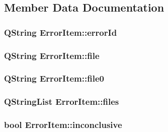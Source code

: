 \subsection{Member Data Documentation}
\hypertarget{class_error_item_aff1725eaf4ca3d7ce627a451b38b712a}{
\subsubsection[{error\-Id}]{\setlength{\rightskip}{0pt plus 5cm}Q\-String Error\-Item\-::error\-Id}}\label{class_error_item_aff1725eaf4ca3d7ce627a451b38b712a}
\hypertarget{class_error_item_a7ef5bfcb23db4b9ee239cb23a51dbe3c}{
\subsubsection[{file}]{\setlength{\rightskip}{0pt plus 5cm}Q\-String Error\-Item\-::file}}\label{class_error_item_a7ef5bfcb23db4b9ee239cb23a51dbe3c}
\hypertarget{class_error_item_a37601c0b1e90e2837ef6600180640868}{
\subsubsection[{file0}]{\setlength{\rightskip}{0pt plus 5cm}Q\-String Error\-Item\-::file0}}\label{class_error_item_a37601c0b1e90e2837ef6600180640868}
\hypertarget{class_error_item_a6ceb9b47326884878a038c1bc1df710d}{
\subsubsection[{files}]{\setlength{\rightskip}{0pt plus 5cm}Q\-String\-List Error\-Item\-::files}}\label{class_error_item_a6ceb9b47326884878a038c1bc1df710d}
\hypertarget{class_error_item_a24f122bf960197ac9ed5c1106f08f6f4}{
\subsubsection[{inconclusive}]{\setlength{\rightskip}{0pt plus 5cm}bool Error\-Item\-::inconclusive}}\label{class_error_item_a24f122bf960197ac9ed5c1106f08f6f4}
